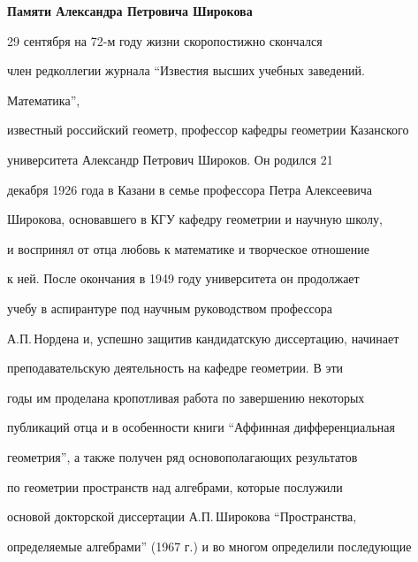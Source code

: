 


\pagestyle{empty}



\bigskip

\bigskip



{\centerline {\bf Памяти Александра Петровича Широкова}}

\bigskip



29 сентября на 72-м году жизни скоропостижно скончался

член редколлегии журнала ``Известия высших учебных заведений.

Математика'',

известный российский геометр, профессор кафедры геометрии Казанского

университета Александр Петрович Широков. Он родился 21

декабря 1926 года в Казани в семье профессора Петра Алексеевича

Широкова, основавшего в КГУ кафедру геометрии и научную школу,

и воспринял от отца любовь к математике и творческое отношение

к ней. После окончания в 1949 году университета он продолжает

учебу в аспирантуре под научным руководством профессора

А.П.\,Нордена и, успешно защитив кандидатскую диссертацию, начинает

преподавательскую деятельность на кафедре геометрии. В эти

годы им проделана кропотливая работа по завершению некоторых

публикаций отца и в особенности книги ``Аффинная дифференциальная

геометрия'', а также получен ряд основополагающих результатов

по геометрии пространств над алгебрами, которые послужили

основой докторской диссертации А.П.\,Широкова ``Пространства,

определяемые алгебрами'' (1967 г.) и во многом определили последующие

